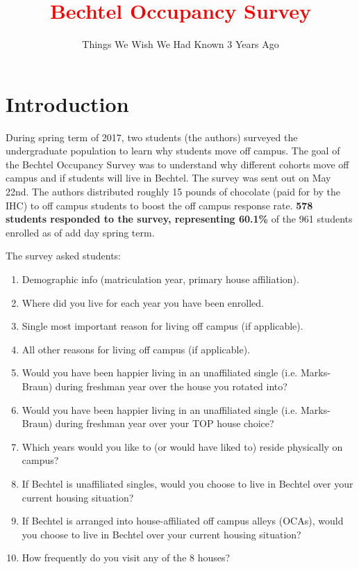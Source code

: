\documentclass[12pt]{article} %
\title{\textbf{\textcolor{Red}{Bechtel Occupancy Survey}}}
\subtitle{Things We Wish We Had Known 3 Years Ago}
\begin{document}
\maketitle
\tableofcontents
\newpage

\section{Introduction}

During spring term of 2017, two students (the authors) surveyed the undergraduate population to learn why students move off campus. The goal of the Bechtel Occupancy Survey was to understand why different cohorts move off campus and if students will live in Bechtel. The survey was sent out on May 22nd. The authors distributed roughly 15 pounds of chocolate (paid for by the IHC) to off campus students to boost the off campus response rate. \textbf{578 students responded to the survey, representing 60.1\%} of the 961 students enrolled as of add day spring term.

The survey asked students:

\begin{enumerate}
	\item Demographic info (matriculation year, primary house affiliation).
	\item Where did you live for each year you have been enrolled.
	\item Single most important reason for living off campus (if applicable).
	\item All other reasons for living off campus (if applicable).
	\item Would you have been happier living in an unaffiliated single (i.e. Marks-Braun) during freshman year over the house you rotated into? 
	\item Would you have been happier living in an unaffiliated single (i.e. Marks-Braun) during freshman year over your TOP house choice?
	\item Which years would you like to (or would have liked to) reside physically on campus?
	\item If Bechtel is unaffiliated singles, would you choose to live in Bechtel over your current housing situation?
	\item If Bechtel is arranged into house-affiliated off campus alleys (OCAs), would you choose to live in Bechtel over your current housing situation?
	\item How frequently do you visit any of the 8 houses?
\end{enumerate}
\end{document}
